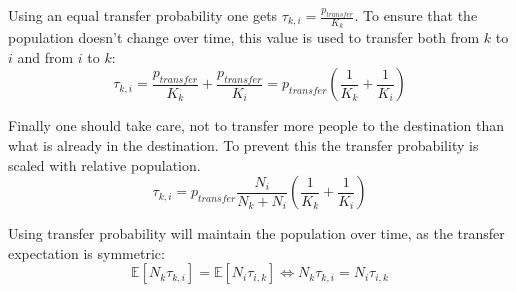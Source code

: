 Using an equal transfer probability one gets $\tau_{k, i} = \frac{p_{transfer}}{K_k}$. To ensure that the population doesn't change over time, this value is used to transfer both from $k$ to $i$ and from $i$ to $k$:
\begin{equation}
\tau_{k, i} = \frac{p_{transfer}}{K_k} + \frac{p_{transfer}}{K_i} = p_{transfer} \left(\frac{1}{K_k} + \frac{1}{K_i}\right)
\end{equation}

Finally one should take care, not to transfer more people to the destination than what is already in the destination. To prevent this the transfer probability is scaled with relative population.
\begin{equation}
\tau_{k, i} = p_{transfer} \frac{N_i}{N_k + N_i} \left(\frac{1}{K_k} + \frac{1}{K_i}\right)
\end{equation}

Using transfer probability will maintain the population over time, as the transfer expectation is symmetric:
\begin{equation}
\mathbb{E}[N_k \tau_{k, i}] = \mathbb{E}[N_i \tau_{i, k}] \Leftrightarrow N_k \tau_{k, i} = N_i \tau_{i, k}
\end{equation}
